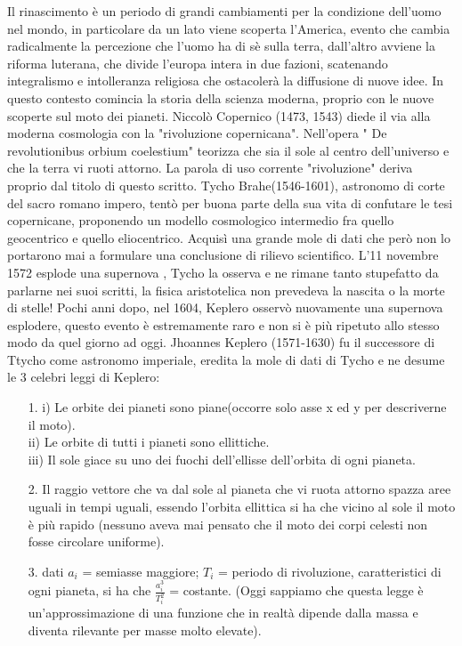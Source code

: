 Il rinascimento è un periodo di grandi cambiamenti per la condizione dell'uomo nel mondo, in particolare da un lato viene scoperta l'America, evento che cambia radicalmente la percezione che l'uomo ha di sè sulla terra, dall'altro avviene la riforma luterana, che divide l'europa intera in due fazioni, scatenando integralismo e intolleranza religiosa che ostacolerà la diffusione di nuove idee. In questo contesto comincia la storia della scienza moderna, proprio con le nuove scoperte sul moto dei pianeti. Niccolò Copernico (1473, 1543) diede il via alla moderna cosmologia con la "rivoluzione copernicana". Nell'opera " De revolutionibus orbium coelestium" teorizza che sia il sole al centro dell'universo e che la terra vi ruoti attorno. La parola di uso corrente "rivoluzione" deriva proprio dal titolo di questo scritto. Tycho Brahe(1546-1601), astronomo di corte del sacro romano impero, tentò per buona parte della sua vita di confutare le tesi copernicane, proponendo un modello cosmologico intermedio fra quello geocentrico e quello eliocentrico. Acquisì una grande mole di dati che però non lo portarono mai a formulare una conclusione di rilievo scientifico. L'11 novembre 1572 esplode una supernova , Tycho la osserva e ne rimane tanto stupefatto da parlarne nei suoi scritti, la fisica aristotelica non prevedeva la nascita o la morte di stelle! Pochi anni dopo, nel 1604, Keplero osservò nuovamente una supernova esplodere, questo evento è estremamente raro e non si è più ripetuto allo stesso modo da quel giorno ad oggi. Jhoannes Keplero (1571-1630) fu il successore di Ttycho come astronomo imperiale, eredita la mole di dati di Tycho e ne desume le 3 celebri leggi di Keplero:
\begin{itemize}
\item[1.] i) Le orbite dei pianeti sono piane(occorre solo asse x ed y per descriverne il moto). \\
ii) Le orbite di tutti i pianeti sono ellittiche.\\
iii) Il sole giace su uno dei fuochi dell'ellisse dell'orbita di ogni pianeta. 
\item[2.]Il raggio vettore che va dal sole al pianeta che vi ruota attorno spazza aree uguali in tempi uguali, essendo l'orbita ellittica si ha che vicino al sole il moto è più rapido (nessuno aveva mai pensato che il moto dei corpi celesti non fosse circolare uniforme). 
\item[3.] dati $a_i$ = semiasse maggiore; $T_i$ = periodo di rivoluzione, caratteristici di ogni pianeta, si ha che $\frac{a_i^3}{T_i^2}$ = costante. (Oggi sappiamo che questa legge è un'approssimazione di una funzione che in realtà dipende dalla massa e diventa rilevante per masse molto elevate).
\end{itemize}
